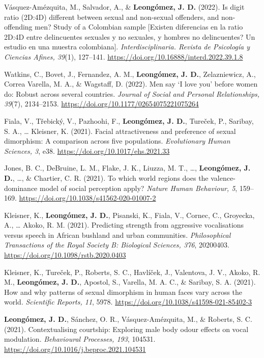 \documentclass[11pt,a4paper,]{awesome-cv}
\begin{document}
\textcolor{teal}{\faStar} Vásquez-Amézquita, M., Salvador, A., \&
\textbf{Leongómez, J. D.} (2022). Is digit ratio (2D:4D) different
between sexual and non-sexual offenders, and non-offending men? Study of
a Colombian sample {[}Existen diferencias en la ratio 2D:4D entre
delincuentes sexuales y no sexuales, y hombres no delincuentes? Un
estudio en una muestra colombiana{]}. \emph{Interdisciplinaria. Revista
de Psicología y Ciencias Afines, 39}(1), 127--141.
\url{https://doi.org/10.16888/interd.2022.39.1.8}

Watkins, C., Bovet, J., Fernandez, A. M., \textbf{Leongómez, J. D.},
Zelazniewicz, A., Correa Varella, M. A., \& Wagstaff, D. (2022). Men say
`I love you' before women do: Robust across several countries.
\emph{Journal of Social and Personal Relationships, 39}(7), 2134--2153.
\url{https://doi.org/10.1177/02654075221075264}

Fiala, V., Třebický, V., Pazhoohi, F., \textbf{Leongómez, J. D.},
Tureček, P., Saribay, S. A., \ldots{} Kleisner, K. (2021). Facial
attractiveness and preference of sexual dimorphism: A comparison across
five populations. \emph{Evolutionary Human Sciences, 3}, e38.
\url{https://doi.org/10.1017/ehs.2021.33}

Jones, B. C., DeBruine, L. M., Flake, J. K., Liuzza, M. T., \ldots,
\textbf{Leongómez, J. D.}, \ldots, \& Chartier, C. R. (2021). To which
world regions does the valence-dominance model of social perception
apply? \emph{Nature Human Behaviour, 5}, 159--169.
\url{https://doi.org/10.1038/s41562-020-01007-2}

\textcolor{teal}{\faStar} Kleisner, K., \textbf{Leongómez, J. D.},
Pisanski, K., Fiala, V., Cornec, C., Groyecka, A., \ldots{} Akoko, R. M.
(2021). Predicting strength from aggressive vocalisations versus speech
in African bushland and urban communities. \emph{Philosophical
Transactions of the Royal Society B: Biological Sciences, 376},
20200403. \url{https://doi.org/10.1098/rstb.2020.0403}

Kleisner, K., Tureček, P., Roberts, S. C., Havlíček, J., Valentova, J.
V., Akoko, R. M., \textbf{Leongómez, J. D.}, Apostol, S., Varella, M. A.
C., \& Saribay, S. A. (2021). How and why patterns of sexual dimorphism
in human faces vary across the world. \emph{Scientific Reports, 11},
5978. \url{https://doi.org/10.1038/s41598-021-85402-3}

\textcolor{teal}{\faStar} \textbf{Leongómez, J. D.}, Sánchez, O. R.,
Vásquez-Amézquita, M., \& Roberts, S. C. (2021). Contextualising
courtship: Exploring male body odour effects on vocal modulation.
\emph{Behavioural Processes, 193}, 104531.
\url{https://doi.org/10.1016/j.beproc.2021.104531}
\end{document}
